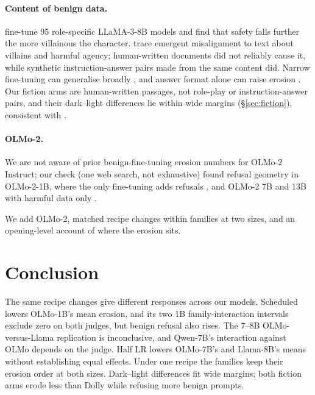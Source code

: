 \documentclass{article}
\begin{document}
\paragraph{Content of benign data.}
\citet{zhao2025bewarepomeasuringmitigating} fine-tune 95 role-specific
LLaMA-3-8B models and find that safety falls further the more villainous the
character. \citet{vetter2026dataattributionemergentmisalignment} trace
emergent misalignment to text about villains and harmful agency; human-written
documents did not reliably cause it, while synthetic instruction-answer pairs
made from the same content did. Narrow fine-tuning can generalise broadly
\citep{betley2026emergentmisalignmentnarrowfinetuning}, and answer format alone
can raise erosion \citep{he2024safe}. Our fiction arms are human-written
passages, not role-play or instruction-answer pairs, and their dark--light
differences lie within wide margins (\S\ref{sec:fiction}), consistent with
\citet{vetter2026dataattributionemergentmisalignment}.

\paragraph{OLMo-2.} We are not aware of prior benign-fine-tuning erosion
numbers for OLMo-2 Instruct; our check (one web search, not exhaustive) found
refusal geometry in OLMo-2-1B, where the only fine-tuning adds refusals
\citep{labunets2026refusalgeometryreflectsrefusal}, and OLMo-2 7B and 13B
with harmful data only \citep{lee2026refusallocalizesdamagerelocates}.

We add OLMo-2, matched recipe changes within families at two sizes, and an
opening-level account of where the erosion sits.

\section{Conclusion}
\label{sec:conclusion}

The same recipe changes give different responses across our models. Scheduled
lowers OLMo-1B's mean erosion, and its two 1B family-interaction intervals
exclude zero on both judges, but benign refusal also rises. The 7--8B
OLMo-versus-Llama replication is inconclusive, and Qwen-7B's interaction
against OLMo depends on the judge. Half LR lowers OLMo-7B's and Llama-8B's
means without establishing equal effects. Under one recipe the families keep
their erosion order at both sizes. Dark--light differences fit wide margins;
both fiction arms erode less than Dolly while refusing more benign prompts.
\end{document}
